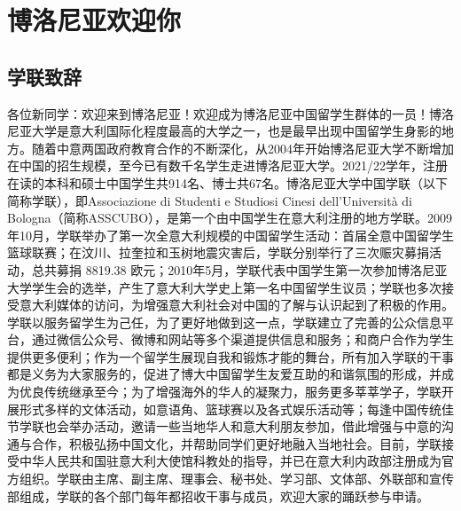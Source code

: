 
% 


\chapter{博洛尼亚欢迎你}                 %

\section{学联致辞}

各位新同学：欢迎来到博洛尼亚！欢迎成为博洛尼亚中国留学生群体的一员！博洛尼亚大学是意大利国际化程度最高的大学之一，也是最早出现中国留学生身影的地方。随着中意两国政府教育合作的不断深化，从2004年开始博洛尼亚大学不断增加在中国的招生规模，至今已有数千名学生走进博洛尼亚大学。2021/22学年，注册在读的本科和硕士中国学生共914名、博士共67名。博洛尼亚大学中国学联（以下简称学联），即Associazione di Studenti e Studiosi Cinesi dell'Università di Bologna（简称ASSCUBO），是第一个由中国学生在意大利注册的地方学联。2009年10月，学联举办了第一次全意大利规模的中国留学生活动：首届全意中国留学生篮球联赛；在汶川、拉奎拉和玉树地震灾害后，学联分别举行了三次赈灾募捐活动，总共募捐 8819.38 欧元；2010年5月，学联代表中国学生第一次参加博洛尼亚大学学生会的选举，产生了意大利大学史上第一名中国留学生议员；学联也多次接受意大利媒体的访问，为增强意大利社会对中国的了解与认识起到了积极的作用。学联以服务留学生为己任，为了更好地做到这一点，学联建立了完善的公众信息平台，通过微信公众号、微博和网站等多个渠道提供信息和服务；和商户合作为学生提供更多便利；作为一个留学生展现自我和锻炼才能的舞台，所有加入学联的干事都是义务为大家服务的，促进了博大中国留学生友爱互助的和谐氛围的形成，并成为优良传统继承至今；为了增强海外的华人的凝聚力，服务更多莘莘学子，学联开展形式多样的文体活动，如意语角、篮球赛以及各式娱乐活动等；每逢中国传统佳节学联也会举办活动，邀请一些当地华人和意大利朋友参加，借此增强与中意的沟通与合作，积极弘扬中国文化，并帮助同学们更好地融入当地社会。目前，学联接受中华人民共和国驻意大利大使馆科教处的指导，并已在意大利内政部注册成为官方组织。学联由主席、副主席、理事会、秘书处、学习部、文体部、外联部和宣传部组成，学联的各个部门每年都招收干事与成员，欢迎大家的踊跃参与申请。

